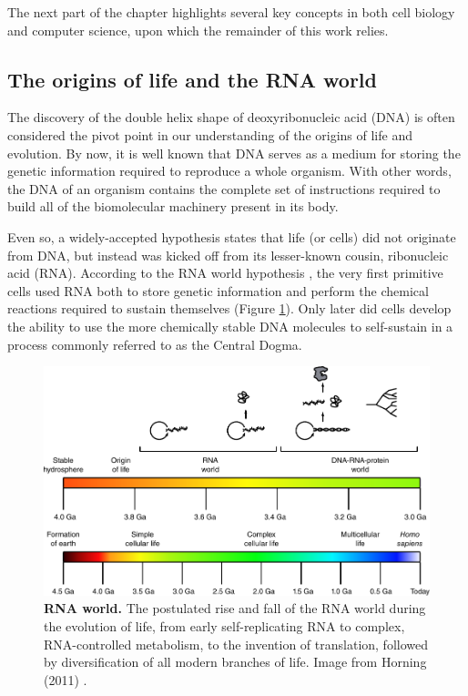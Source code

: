 The next part of the chapter highlights several key concepts in both cell biology and computer science, upon which the remainder of this work relies.

\subsection{The origins of life and the RNA world}
The discovery of the double helix shape of deoxyribonucleic acid (DNA) \cite{watson_molecularstructurenucleic_1953} is often considered the pivot point in our understanding of the origins of life and evolution. By now, it is well known that DNA serves as a medium for storing the genetic information required to reproduce a whole organism. With other words, the DNA of an organism contains the complete set of instructions required to build all of the biomolecular machinery present in its body.

Even so, a widely-accepted hypothesis states that life (or cells) did not originate from DNA, but instead was kicked off from its lesser-known cousin, ribonucleic acid (RNA). According to the RNA world hypothesis \cite{alberts_rnaworldorigins_2002}, the very first primitive cells used RNA both to store genetic information and perform the chemical reactions required to sustain themselves (Figure \ref{fig:rnaworld}). Only later did cells develop the ability to use the more chemically stable DNA molecules to self-sustain in a process commonly referred to as the Central Dogma.

\begin{figure}[htb!]
	\centering\includegraphics[width=.5\linewidth]{fig/rnaworld} %
	\caption{
		\textbf{RNA world.} The postulated rise and fall of the RNA world during the evolution of life, from early self-replicating RNA to complex, RNA-controlled metabolism, to the invention of translation, followed by diversification of all modern branches of life. Image from Horning (2011) \cite{horning_rnaworld_2011}. %
	}
	\label{fig:rnaworld}
\end{figure}

